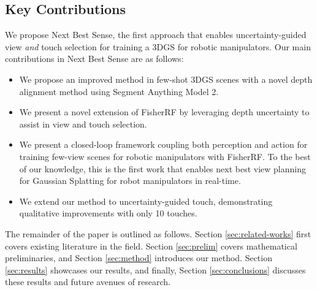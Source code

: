 



\subsection{Key Contributions}
We propose Next Best Sense, the first approach that enables uncertainty-guided view \textit{and} touch selection for training a \gls*{3DGS} for robotic manipulators. Our main contributions in Next Best Sense are as follows:
\begin{itemize}
    \item We propose an improved method in few-shot 3DGS scenes with a novel depth alignment method using Segment Anything Model 2.
    \item We present a novel extension of FisherRF by leveraging depth uncertainty to assist in view and touch selection.
    \item We present a closed-loop framework coupling both perception and action for training few-view scenes for robotic manipulators with FisherRF. To the best of our knowledge, this is the first work that enables next best view planning for Gaussian Splatting for robot manipulators in real-time. 
    \item We extend our method to uncertainty-guided touch, demonstrating qualitative improvements with only 10 touches.
\end{itemize}

The remainder of the paper is outlined as follows. Section \ref{sec:related-works} first covers existing literature in the field. Section \ref{sec:prelim} covers mathematical preliminaries, and Section \ref{sec:method} introduces our method. Section \ref{sec:results} showcases our results, and finally, Section \ref{sec:conclusions} discusses these results and future avenues of research.



